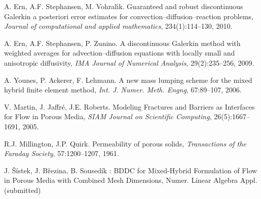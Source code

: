 \documentclass[11pt]{report}
\begin{document}
\begin{thebibliography}{99}

A. Ern, A.F. Stephansen, M. Vohral{\'\i}k.
Guaranteed and robust discontinuous Galerkin a posteriori error estimates for convection--diffusion--reaction problems,
\emph{Journal of computational and applied mathematics}, 234(1):114--130, 2010.


A. Ern, A.F. Stephansen, P. Zunino.
A discontinuous {G}alerkin method with weighted averages for advection--diffusion equations with locally small and anisotropic diffusivity,
\emph{IMA Journal of Numerical Analysis}, 29(2):235--256, 2009.


A. Younes, P. Ackerer, F. Lehmann.
A new mass lumping scheme for the mixed hybrid finite element method,
\emph{Int. J. Numer. Meth. Engng}, 67:89–107, 2006.


V. Martin, J. Jaffr{\'e}, J.E. Roberts.
Modeling Fractures and Barriers as Interfaces for Flow in Porous Media,
\emph{{SIAM} Journal on Scientific Computing}, 26(5):1667--1691, 2005.


R.J. Millington, J.P. Quirk.
Permeability of porous solids, 
\emph{Transactions of the Faraday Society}, 57:1200--1207, 1961.


J. Šístek, J. Březina, B. Sousedík : BDDC for Mixed-Hybrid 
Formulation of Flow in Porous Media with Combined Mesh Dimensions, Numer. Linear 
Algebra Appl. (submitted)
\end{thebibliography}
\end{document}
